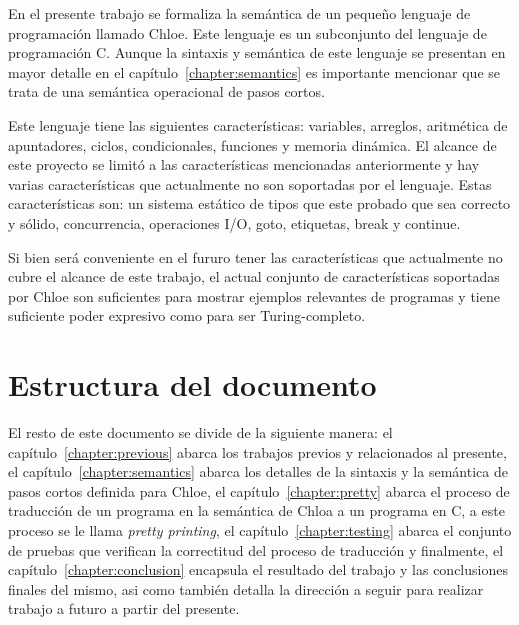 En el presente trabajo se formaliza la semántica de un pequeño lenguaje de programación llamado Chloe.
Este lenguaje es un subconjunto del lenguaje de programación C.
Aunque la sintaxis y semántica de este lenguaje se presentan en mayor detalle en el capítulo~\ref{chapter:semantics} es importante mencionar que se trata de una semántica operacional de pasos cortos.

Este lenguaje tiene las siguientes características: variables, arreglos, aritmética de apuntadores, ciclos, condicionales, funciones y memoria dinámica.
El alcance de este proyecto se limitó a las características mencionadas anteriormente y hay varias características que actualmente no son soportadas por el lenguaje.
Estas características son: un sistema estático de tipos que este probado que sea correcto y sólido, concurrencia, operaciones I/O, goto, etiquetas, break y continue.

Si bien será conveniente en el fururo tener las características que actualmente no cubre el alcance de este trabajo, el actual conjunto de características soportadas por Chloe son suficientes para mostrar ejemplos relevantes de programas y tiene suficiente poder expresivo como para ser Turing-completo.


\section{Estructura del documento}\label{section:document_structure}

El resto de este documento se divide de la siguiente manera: el capítulo~\ref{chapter:previous} abarca los trabajos previos y relacionados al presente, el capítulo~\ref{chapter:semantics} abarca los detalles de la sintaxis y la semántica de pasos cortos definida para Chloe, el capítulo~\ref{chapter:pretty} abarca el proceso de traducción de un programa en la semántica de Chloa a un programa en C, a este proceso se le llama \textit{pretty printing}, el capítulo~\ref{chapter:testing} abarca el conjunto de pruebas que verifican la correctitud del proceso de traducción y finalmente, el capítulo~\ref{chapter:conclusion} encapsula el resultado del trabajo y las conclusiones finales del mismo, asi como también detalla la dirección a seguir para realizar trabajo a futuro a partir del presente.
